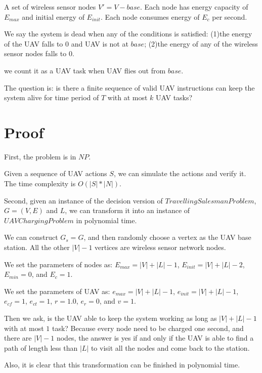 A set of wireless sensor nodes $V' = V - {base}$. Each node has energy capacity of $E_{max}$ and initial energy of $E_{init}$. Each node consumes energy of $E_{c}$ per second.

We say the system is dead when any of the conditions is satisfied:
(1)the energy of the UAV falls to 0 and UAV is not at $base$;
(2)the energy of any of the wireless sensor nodes falls to 0.

we count it as a UAV task when UAV flies out from $base$.

The question is: is there a finite sequence of valid UAV instructions can keep the system alive for time period of $T$ with at most $k$ UAV tasks?
\section{Proof}

First, the problem is in $NP$.

Given a sequence of UAV actions $S$, we can simulate the actions and verify it. The time complexity is $O(|S| * |N|)$.

Second, given an instance of the decision version of $Travelling Salesman Problem$, $G = (V, E)$ and $L$, we can transform it into an instance of $UAV Charging Problem$ in polynomial time.

We can construct $G_s = G$, and then randomly choose a vertex as the UAV base station. All the other $|V|-1$ vertices are wireless sensor network nodes.

We set the parameters of nodes as: $E_{max} = |V| + |L| - 1$, $E_{init} = |V| + |L| - 2$, $E_{min} = 0$, and $E_{c} = 1$.

We set the parameters of UAV as: $e_{max} = |V| + |L| - 1$, $e_{init} = |V| + |L| - 1$, $e_{cf} = 1$, $e_{ct} = 1$, $r = 1.0$, $e_r = 0$, and $v = 1$.

Then we ask, is the UAV able to keep the system working as long as $|V| + |L| - 1$ with at most $1$ task? Because every node need to be charged one second, and there are $|V|-1$ nodes, the answer is yes if and only if the UAV is able to find a path of length less than $|L|$ to visit all the nodes and come back to the station.

Also, it is clear that this transformation can be finished in polynomial time.
